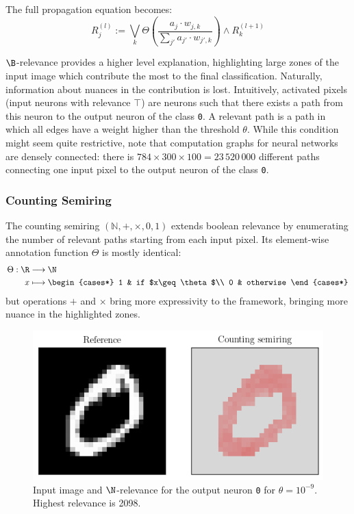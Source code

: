 \documentclass[twocolumn]{../cs-classes/cs-classes}
\newcommand*{\1}{\digitsbb{1}}
\newcommand*{\0}{\digitsbb{0}}
\begin{document}
The full propagation equation becomes:
\begin{equation}
    \tag{$\B$-LRP}
    R^{(l)}_j := \bigvee_{k}\Theta\left(\frac{a_j\cdot w_{j, k}}{\sum_{j'}a_{j'}\cdot w_{j', k}}\right) \land R^{(l+1)}_k
    \label{eq:boolean-lrp}
\end{equation}

$\B$-relevance provides a higher level explanation, highlighting large zones of the input image which contribute the most to the final classification.
Naturally, information about nuances in the contribution is lost. Intuitively, activated pixels (input neurons with relevance $\top$) are neurons such that there exists a  path from this neuron to the output neuron of the class \texttt{0}. A relevant path is a path in which all edges have a weight higher than the threshold $\theta$. While this condition might seem quite restrictive, note that computation graphs for neural networks are densely connected: there is $784\times300\times100=23\,520\,000$ different paths connecting one input pixel to the output neuron of the class \texttt{0}.

\subsubsection{Counting Semiring}
The counting semiring $(\mathbb{N}, +, \times, 0, 1)$ extends boolean relevance by enumerating the number of relevant paths starting from each input pixel. Its element-wise annotation function $\Theta$ is mostly identical:
\begin{equation*}
    \begin{aligned}
        \Theta: \R&\longrightarrow\N\\
        x&\longmapsto \begin{cases*}
            1 & if $x\geq\theta$\\
            0 & otherwise
        \end{cases*}
    \end{aligned}
\end{equation*}
but operations $+$ and $\times$ bring more expressivity to the framework, bringing more nuance in the highlighted zones.

\begin{figure}[H]
    \centering
    \includegraphics[width=.9\linewidth]{counting.png}
    \caption{Input image and $\N$-relevance for the output neuron \texttt{0} for $\theta=10^{-9}$. Highest relevance is 2098.}
\end{figure}
\end{document}
